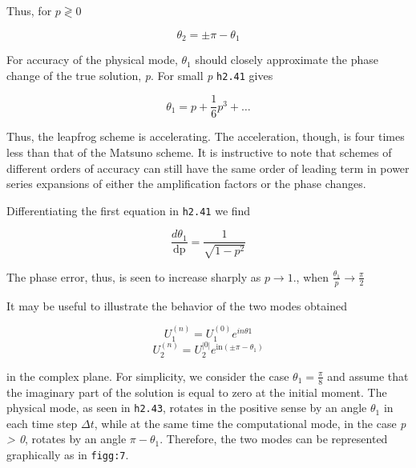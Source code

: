 Thus, for \(p \gtrless 0\)

\[\theta_{2} = \pm \pi - \theta_{1}\]

For accuracy of the physical mode, \(\theta_{1}\) should closely
approximate the phase change of the true solution, \emph{p}. For small
\emph{p} \texttt{h2.41} gives

\[\theta_{1} = p + \frac{1}{6}p^{3} + \ldots\]

Thus, the leapfrog scheme is accelerating. The acceleration, though, is
four times less than that of the Matsuno scheme. It is instructive to
note that schemes of different orders of accuracy can still have the
same order of leading term in power series expansions of either the
amplification factors or the phase changes.

Differentiating the first equation in \texttt{h2.41} we find

\[\frac{d\theta_{1}}{\text{dp}} = \frac{1}{\sqrt{1 - p^{2}}}\]

The phase error, thus, is seen to increase sharply as
\(p \rightarrow 1.\), when
\(\frac{\theta_{1}}{p} \rightarrow \frac{\pi}{2}\)

It may be useful to illustrate the behavior of the two modes obtained

\[
    U_{1}^{\left( n \right)}=
    U_{1}^{\left( 0 \right)}e^{in\theta 1}\]\[U_{2}^{\left( n \right)} =
    U_{2}^{\left| 0 \right|}e^{\text{in}\left( \pm \pi - \theta_{1} \right)}
\]

in the complex plane. For simplicity, we consider the case
\(\theta_{1} = \frac{\pi}{8}\) and assume that the imaginary part of the
solution is equal to zero at the initial moment. The physical mode, as
seen in \texttt{h2.43}, rotates in the positive sense by an angle
\(\theta_{1}\) in each time step \(\Delta t\), while at the same time
the computational mode, in the case \emph{p \textgreater{} 0}, rotates
by an angle \(\pi - \theta_{1}\). Therefore, the two modes can be
represented graphically as in \texttt{figg:7}.

